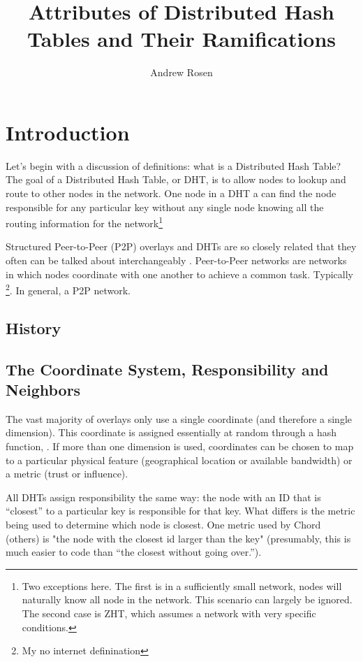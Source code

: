 \documentclass[10pt,letterpaper]{report}
\author{Andrew Rosen}
\title{Attributes of Distributed Hash Tables and Their Ramifications}
\begin{document}
\maketitle
\setcounter{tocdepth}{4}



\tableofcontents

\chapter{Introduction}

Let's begin with a discussion of definitions:  what is a Distributed Hash Table?  
The goal of a Distributed Hash Table, or DHT, is to allow nodes to lookup and route to other nodes in the network.
One node in a DHT a can find the node responsible for any particular key  without any single node knowing all the routing information for the network\footnote{Two exceptions here.  
The first is in a sufficiently small network, nodes will naturally know  all node in the network. This scenario can largely be ignored.  The second case is ZHT, which assumes a network with very specific conditions.}


Structured Peer-to-Peer (P2P) overlays and DHTs are so closely related that they often can be talked about interchangeably \cite{wu2004handbook}. 
Peer-to-Peer networks are networks in which nodes coordinate with one another to achieve a common task. 
Typically \footnote{My no internet definination}.  In general, a P2P network. 

\section{History}


\section{The Coordinate System, Responsibility and Neighbors}
The vast majority of overlays only use a single coordinate (and therefore a single dimension).  
This coordinate is assigned essentially at random through a hash function, .  
If more than one dimension is used, coordinates can be chosen to map to a particular physical feature (geographical location  or available bandwidth) or a metric (trust or influence).

All DHTs assign responsibility the same way:  the node with an ID that is ``closest'' to a particular key is responsible for that key.  What differs is the metric being used to determine which node is closest.  One metric used by Chord (others) is "the node with the closest id larger than the key" (presumably, this is much easier to code than ``the closest without going over.'').
\end{document}

